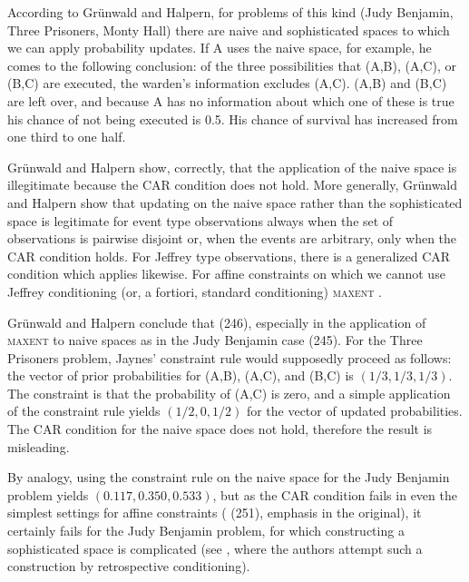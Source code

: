\documentclass[12pt]{article}
\begin{document}
According to Gr{\"u}nwald and Halpern, for problems of this kind (Judy
Benjamin, Three Prisoners, Monty Hall) there are naive and
sophisticated spaces to which we can apply probability updates. If A
uses the naive space, for example, he comes to the following
conclusion: of the three possibilities that (A,B), (A,C), or (B,C) are
executed, the warden's information excludes (A,C). (A,B) and (B,C) are
left over, and because A has no information about which one of these
is true his chance of not being executed is 0.5. His chance of
survival has increased from one third to one half. 

Gr{\"u}nwald and Halpern show, correctly, that the application of the
naive space is illegitimate because the CAR condition does not hold.
More generally, Gr{\"u}nwald and Halpern show that updating on the
naive space rather than the sophisticated space is legitimate for
event type observations always when the set of observations is
pairwise disjoint or, when the events are arbitrary, only when the CAR
condition holds. For Jeffrey type observations, there is a generalized
CAR condition which applies likewise. For affine constraints on which
we cannot use Jeffrey conditioning (or, a fortiori, standard
conditioning) \textsc{maxent } .

Gr{\"u}nwald and Halpern conclude that  (246), especially in the application of
\textsc{maxent} to naive spaces as in the Judy Benjamin case
 (245). For the Three Prisoners problem,
Jaynes' constraint rule would supposedly proceed as follows: the
vector of prior probabilities for (A,B), (A,C), and (B,C) is
$(1/3,1/3,1/3)$. The constraint is that the probability of (A,C) is
zero, and a simple application of the constraint rule yields
$(1/2,0,1/2)$ for the vector of updated probabilities. The CAR
condition for the naive space does not hold, therefore the result is
misleading.

By analogy, using the constraint rule on the naive space for the Judy
Benjamin problem yields $(0.117,0.350,0.533)$, but as the CAR
condition fails in even the simplest settings for affine constraints
( (251), emphasis in the original),
it certainly fails for the Judy Benjamin problem, for which
constructing a sophisticated space is complicated (see
, where the authors attempt such a
construction by retrospective conditioning).
\end{document}
